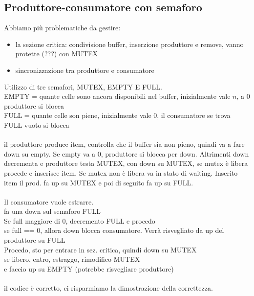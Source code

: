 \documentclass{article}
\begin{document}
\subsection{Produttore-consumatore con semaforo}
Abbiamo più problematiche da gestire:
\begin{itemize}
    \item la sezione critica: condivisione buffer, inserzione produttore e remove, vanno protette (???) con MUTEX
    \item sincronizzazione tra produttore e consumatore
\end{itemize}
Utilizzo di tre semafori, MUTEX, EMPTY E FULL.\\
EMPTY = quante celle sono ancora disponibili nel buffer, inizialmente vale $n$, a 0 produttore si blocca\\
FULL = quante celle son piene, inizialmente vale 0, il consumatore se trova FULL vuoto si blocca\\
\\
il produttore produce item, controlla che il buffer sia non pieno, quindi va a fare down su empty. Se empty va a 0, produttore si blocca per down. Altrimenti down decrementa e produttore testa MUTEX, con down su MUTEX, se mutex è libera procede e inserisce item. Se mutex non è libera va in stato di waiting. Inserito item il prod. fa up su MUTEX e poi di seguito fa up su FULL.\\
\\
Il consumatore vuole estrarre.\\
fa una down sul semaforo FULL\\
Se full maggiore di 0, decremento FULL e procedo\\
se full == 0, allora down blocca consumatore. Verrà risvegliato da up del produttore su FULL\\
Procedo, sto per entrare in sez. critica, quindi down su MUTEX\\
se libero, entro, estraggo, rimodifico MUTEX\\
e faccio up su EMPTY (potrebbe risvegliare produttore)\\
\\
il codice è corretto, ci risparmiamo la dimostrazione della correttezza.\\
\end{document}
